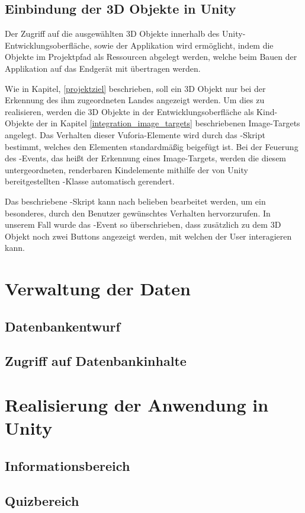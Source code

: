 \subsection{Einbindung der 3D Objekte in Unity}
Der Zugriff auf die ausgewählten 3D Objekte innerhalb des Unity-Entwicklungsoberfläche, sowie der Applikation wird ermöglicht, indem die Objekte im Projektpfad als Ressourcen abgelegt werden, welche beim Bauen der Applikation auf das Endgerät mit übertragen werden. 

Wie in Kapitel, \ref{projektziel} beschrieben, soll ein 3D Objekt nur bei der Erkennung des ihm zugeordneten Landes angezeigt werden.
Um dies zu realisieren, werden die 3D Objekte in der Entwicklungsoberfläche als Kind-Objekte der in Kapitel \ref{integration_image_targets} beschriebenen Image-Targets angelegt.
Das Verhalten dieser Vuforia-Elemente wird durch das -Skript bestimmt, welches den Elementen standardmäßig beigefügt ist. 
Bei der Feuerung des -Events, das heißt der Erkennung eines Image-Targets, werden die diesem untergeordneten, renderbaren Kindelemente mithilfe der von Unity bereitgestellten -Klasse automatisch gerendert.

Das beschriebene -Skript kann nach belieben bearbeitet werden, um ein besonderes, durch den Benutzer gewünschtes Verhalten hervorzurufen.
In unserem Fall wurde das -Event so überschrieben, dass zusätzlich zu dem 3D Objekt noch zwei Buttons angezeigt werden, mit welchen der User interagieren kann.

\section{Verwaltung der Daten}
\subsection{Datenbankentwurf}\label{datenbankentwurf}
\subsection{Zugriff auf Datenbankinhalte}

\section{Realisierung der Anwendung in Unity}
\subsection{Informationsbereich}
\subsection{Quizbereich}
